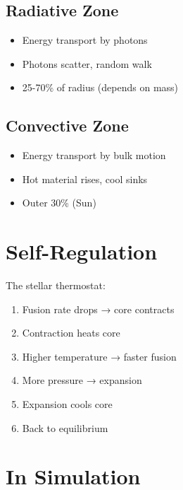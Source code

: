 \documentclass[
  11pt,
  letterpaper,
  twoside,
  openright]{book}
\providecommand{\tightlist}{%
  \setlength{\itemsep}{0pt}\setlength{\parskip}{0pt}}
\begin{document}
\subsection{Radiative Zone}\label{radiative-zone}

\begin{itemize}
\tightlist
\item
  Energy transport by photons
\item
  Photons scatter, random walk
\item
  25-70\% of radius (depends on mass)
\end{itemize}

\subsection{Convective Zone}\label{convective-zone}

\begin{itemize}
\tightlist
\item
  Energy transport by bulk motion
\item
  Hot material rises, cool sinks
\item
  Outer 30\% (Sun)
\end{itemize}

\section{Self-Regulation}\label{self-regulation}

The stellar thermostat:

\begin{enumerate}
\def\labelenumi{\arabic{enumi}.}
\tightlist
\item
  Fusion rate drops → core contracts
\item
  Contraction heats core
\item
  Higher temperature → faster fusion
\item
  More pressure → expansion
\item
  Expansion cools core
\item
  Back to equilibrium
\end{enumerate}

\section{In Simulation}\label{in-simulation-12}
\end{document}
